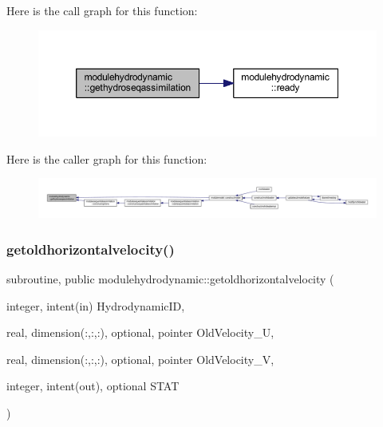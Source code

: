 Here is the call graph for this function\+:\nopagebreak
\begin{figure}[H]
\begin{center}
\leavevmode
\includegraphics[width=350pt]{namespacemodulehydrodynamic_ab2980a48cd10c0f2def3784cbf27608c_cgraph}
\end{center}
\end{figure}
Here is the caller graph for this function\+:\nopagebreak
\begin{figure}[H]
\begin{center}
\leavevmode
\includegraphics[width=350pt]{namespacemodulehydrodynamic_ab2980a48cd10c0f2def3784cbf27608c_icgraph}
\end{center}
\end{figure}
\mbox{\label{namespacemodulehydrodynamic_a7161ffc34f27ea1c9e5f1f9bdc165d07}} 
\subsubsection{\texorpdfstring{getoldhorizontalvelocity()}{getoldhorizontalvelocity()}}
{\footnotesize\ttfamily subroutine, public modulehydrodynamic\+::getoldhorizontalvelocity (\begin{DoxyParamCaption}\item[{integer, intent(in)}]{Hydrodynamic\+ID,  }\item[{real, dimension(\+:,\+:,\+:), optional, pointer}]{Old\+Velocity\+\_\+U,  }\item[{real, dimension(\+:,\+:,\+:), optional, pointer}]{Old\+Velocity\+\_\+V,  }\item[{integer, intent(out), optional}]{S\+T\+AT }\end{DoxyParamCaption})}

